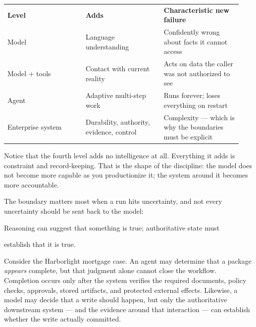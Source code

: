 \BookTableStart
\small
\begin{tabular}{@{}Y{0.3133\linewidth}Y{0.3133\linewidth}Y{0.3133\linewidth}@{}}
\color{white}\bfseries Level & \color{white}\bfseries Adds & \color{white}\bfseries Characteristic new failure \\
Model & Language understanding & Confidently wrong about facts it cannot access \\
Model + tools & Contact with current reality & Acts on data the caller was not authorized to see \\
Agent & Adaptive multi-step work & Runs forever; loses everything on restart \\
Enterprise system & Durability, authority, evidence, control & Complexity — which is why the boundaries must be explicit \\
\end{tabular}
\BookTableEnd

Notice that the fourth level adds no intelligence at all. Everything it adds is constraint and record-keeping. That is the shape of the discipline: the model does not become more capable as you productionize it; the system around it becomes more accountable.\par

The boundary matters most when a run hits uncertainty, and not every uncertainty should be sent back to the model:\par

\begin{bookquote}

Reasoning can suggest that something is true; authoritative state must

\end{bookquote}

\begin{bookquote}

establish that it is true.

\end{bookquote}

Consider the Harborlight mortgage case. An agent may determine that a package \emph{appears} complete, but that judgment alone cannot close the workflow. Completion occurs only after the system verifies the required documents, policy checks, approvals, stored artifacts, and protected external effects. Likewise, a model may decide that a write should happen, but only the authoritative downstream system — and the evidence around that interaction — can establish whether the write actually committed.\par

